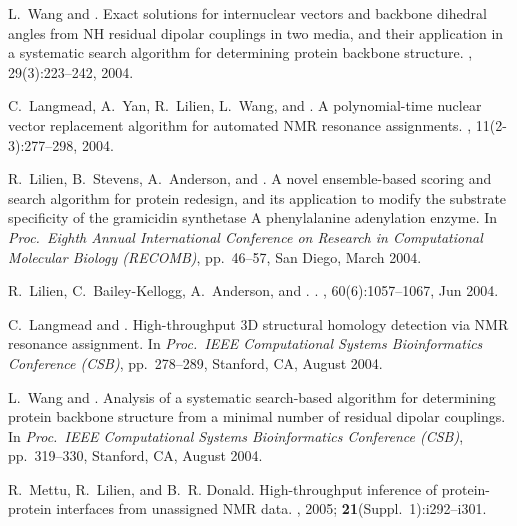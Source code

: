 \documentclass[11pt]{nih}
\begin{document}
\begin{Enumerate}
L.~Wang and {\brd}.
\newblock Exact solutions for internuclear vectors and backbone dihedral angles
  from {NH} residual dipolar couplings in two media, and their application in a
  systematic search algorithm for determining protein backbone structure.
, 29(3):223--242, 2004.

C.~Langmead, A.~Yan, R.~Lilien, L.~Wang, and {\brd}.
\newblock A polynomial-time nuclear vector replacement algorithm for automated
  {NMR} resonance assignments.
, 11(2-3):277--298, 2004.

R.~Lilien, B.~Stevens, A.~Anderson, and {\brd}.
\newblock A novel ensemble-based scoring and search algorithm for protein
  redesign, and its application to modify the substrate specificity of the
  gramicidin synthetase {A} phenylalanine adenylation enzyme.
\newblock In {\em Proc.~Eighth Annual International Conference on
  Research in Computational Molecular Biology ({RECOMB})}, pp.~46--57, San
  Diego, March 2004.

R.~Lilien, C.~Bailey-Kellogg, A.~Anderson, and {\brd}.
.
,
  60(6):1057--1067, Jun 2004.

C.~Langmead and {\brd}.
\newblock High-throughput 3{D} structural homology detection via {NMR}
  resonance assignment.
\newblock In {\em Proc.~{IEEE} Computational Systems
  Bioinformatics Conference ({CSB})}, pp.~278--289, Stanford, CA, August
  2004.


L.~Wang and {\brd}.
\newblock Analysis of a systematic search-based algorithm for determining
  protein backbone structure from a minimal number of residual dipolar
  couplings.
\newblock In {\em Proc.~{IEEE} Computational Systems
  Bioinformatics Conference ({CSB})}, pp.~319--330, Stanford, CA, August
  2004.

R.~Mettu, R.~Lilien, and B.~R. Donald.
\newblock High-throughput inference of protein-protein interfaces from
  unassigned {NMR} data.
, 2005; {\bf{21}}(Suppl.~1):i292--i301.


\end{Enumerate}
\end{document}
